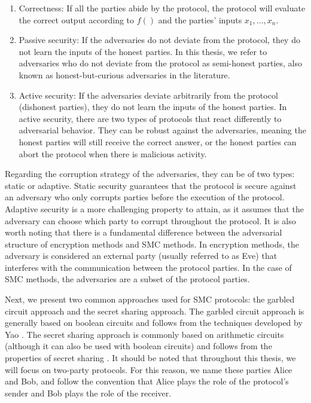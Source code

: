 \begin{enumerate}
\item Correctness: If all the parties abide by the protocol, the protocol will evaluate the correct output according to $f()$ and the parties' inputs $x_1, \ldots, x_n$.

\item Passive security: If the adversaries do not deviate from the protocol, they do not learn the inputs of the honest parties. In this thesis, we refer to adversaries who do not deviate from the protocol as semi-honest parties, also known as honest-but-curious adversaries in the literature.

\item Active security: If the adversaries deviate arbitrarily from the protocol (dishonest parties), they do not learn the inputs of the honest parties. In active security, there are two types of protocols that react differently to adversarial behavior. They can be robust against the adversaries, meaning the honest parties will still receive the correct answer, or the honest parties can abort the protocol when there is malicious activity.
\end{enumerate}

Regarding the corruption strategy of the adversaries, they can be of two types: static or adaptive. Static security guarantees that the protocol is secure against an adversary who only corrupts parties before the execution of the protocol. Adaptive security is a more challenging property to attain, as it assumes that the adversary can choose which party to corrupt throughout the protocol. It is also worth noting that there is a fundamental difference between the adversarial structure of encryption methods and SMC methods. In encryption methods, the adversary is considered an external party (usually referred to as Eve) that interferes with the communication between the protocol parties. In the case of SMC methods, the adversaries are a subset of the protocol parties.

Next, we present two common approaches used for SMC protocols: the garbled circuit approach and the secret sharing approach. The garbled circuit approach is generally based on boolean circuits and follows from the techniques developed by Yao \cite{Yao82}. The secret sharing approach is commonly based on arithmetic circuits (although it can also be used with boolean circuits) and follows from the properties of secret sharing \cite{BGW88, CCD88}. It should be noted that throughout this thesis, we will focus on two-party protocols. For this reason, we name these parties Alice and Bob, and follow the convention that Alice plays the role of the protocol's sender and Bob plays the role of the receiver.

